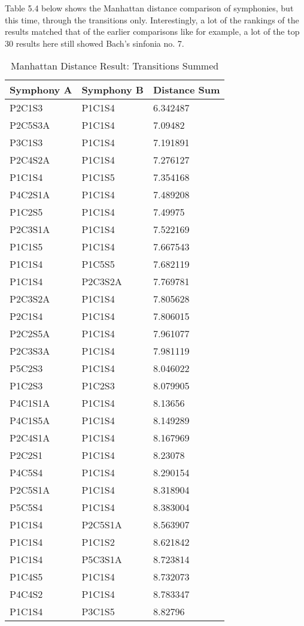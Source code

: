 Table 5.4 below shows the Manhattan distance comparison of symphonies, but this time, through the transitions only. Interestingly, a lot of the rankings of the results matched that of the earlier comparisons like for example, a lot of the top 30 results here still showed Bach’s sinfonia no. 7.

\begin{longtable}{|l|l|l|}
\caption{Manhattan Distance Result: Transitions Summed}
\label{my-label}\\
\hline
Symphony A & Symphony B & Distance Sum \\ \hline
\endfirsthead
%
\endhead
%
P2C1S3 & P1C1S4 & 6.342487 \\ \hline
P2C5S3A & P1C1S4 & 7.09482 \\ \hline
P3C1S3 & P1C1S4 & 7.191891 \\ \hline
P2C4S2A & P1C1S4 & 7.276127 \\ \hline
P1C1S4 & P1C1S5 & 7.354168 \\ \hline
P4C2S1A & P1C1S4 & 7.489208 \\ \hline
P1C2S5 & P1C1S4 & 7.49975 \\ \hline
P2C3S1A & P1C1S4 & 7.522169 \\ \hline
P1C1S5 & P1C1S4 & 7.667543 \\ \hline
P1C1S4 & P1C5S5 & 7.682119 \\ \hline
P1C1S4 & P2C3S2A & 7.769781 \\ \hline
P2C3S2A & P1C1S4 & 7.805628 \\ \hline
P2C1S4 & P1C1S4 & 7.806015 \\ \hline
P2C2S5A & P1C1S4 & 7.961077 \\ \hline
P2C3S3A & P1C1S4 & 7.981119 \\ \hline
P5C2S3 & P1C1S4 & 8.046022 \\ \hline
P1C2S3 & P1C2S3 & 8.079905 \\ \hline
P4C1S1A & P1C1S4 & 8.13656 \\ \hline
P4C1S5A & P1C1S4 & 8.149289 \\ \hline
P2C4S1A & P1C1S4 & 8.167969 \\ \hline
P2C2S1 & P1C1S4 & 8.23078 \\ \hline
P4C5S4 & P1C1S4 & 8.290154 \\ \hline
P2C5S1A & P1C1S4 & 8.318904 \\ \hline
P5C5S4 & P1C1S4 & 8.383004 \\ \hline
P1C1S4 & P2C5S1A & 8.563907 \\ \hline
P1C1S4 & P1C1S2 & 8.621842 \\ \hline
P1C1S4 & P5C3S1A & 8.723814 \\ \hline
P1C4S5 & P1C1S4 & 8.732073 \\ \hline
P4C4S2 & P1C1S4 & 8.783347 \\ \hline
P1C1S4 & P3C1S5 & 8.82796 \\ \hline
\end{longtable}

